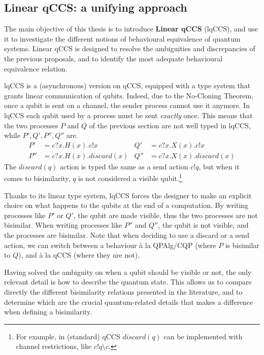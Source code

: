 \subsection*{Linear qCCS: a unifying approach}
The main objective of this thesis is to introduce \textbf{Linear qCCS} (lqCCS), and use it to investigate the different notions of behavioural equivalence of quantum systems. Linear qCCS is designed to resolve the ambiguities and discrepancies of the previous proposals, and to identify the most adequate behavioural equivalence relation.

lqCCS is a (asynchronous) version on qCCS, equipped with a type system that grants linear communication of qubits. Indeed, due to the No-Cloning Theorem, once a qubit is sent on a channel, the sender process cannot use it anymore. In lqCCS each qubit used by a process must be sent \textit{exactly} once. This means that the two processes $P$ and $Q$ of the previous section are not well typed in lqCCS, while $P', Q', P'', Q''$ are.
\begin{align*}
P' &= c?x.H(x).c!x &  Q' &= c?x.X(x).c!x \\
P'' &= c?x.H(x).discard(x) &  Q'' &= c?x.X(x).discard(x)
\end{align*}
The $discard(q)$ action is typed the same as a send action $c!q$, but when it comes to bisimilarity, $q$ is not considered a visible qubit.\footnote{For example, in (standard) qCCS $discard(q)$ can be implemented with channel restrictions, like $c!q\setminus c$.}

Thanks to its linear type system, lqCCS forces the designer to make an explicit choice on what happens to the qubits at the end of a computation. By writing processes like $P'$ or $Q'$, the qubit are made visible, thus the two processes are not bisimilar. When writing processes like $P''$ and $Q''$, the qubit is not visible, and the processes are bisimilar. Note that when deciding to use a discard or a send action, we can switch between a behaviour à la QPAlg/CQP (where $P$ is bisimilar to $Q$), and à la qCCS (where they are not).

Having solved the ambiguity on when a qubit should be visible or not, the only relevant detail is how to describe the quantum state. This allows us to compare directly the different bisimilarity relations presented in the literature, and to determine which are the crucial  quantum-related details that makes a difference when defining a bisimilarity.  

